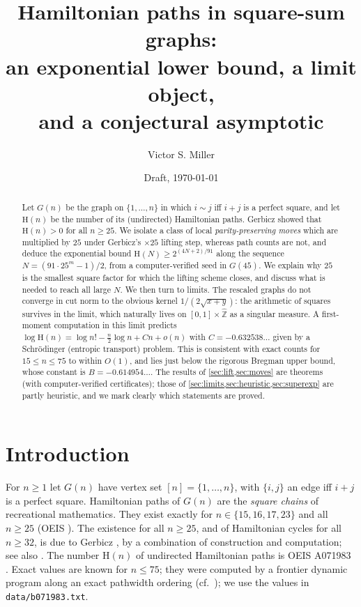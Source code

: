 \documentclass[11pt]{amsart}
\title[Hamiltonian paths in square-sum graphs]{Hamiltonian paths in square-sum graphs:\\
an exponential lower bound, a limit object,\\ and a conjectural asymptotic}
\author{Victor S. Miller}
\date{Draft, \today}
\theoremstyle{definition}
\newcommand{\Ham}{\mathrm{H}}
\newcommand{\Zhat}{\widehat{\mathbb{Z}}}
\begin{document}
\begin{abstract}
Let $G(n)$ be the graph on $\{1,\dots,n\}$ in which $i\sim j$ iff $i+j$ is a perfect
square, and let $\Ham(n)$ be the number of its (undirected) Hamiltonian paths.
Gerbicz showed that $\Ham(n)>0$ for all $n\ge 25$. We isolate a class of local
\emph{parity-preserving moves} which are multiplied by $25$ under Gerbicz's
$\times 25$ lifting step, whereas path counts are not, and deduce the exponential bound
$\Ham(N)\ge 2^{(4N+2)/91}$ along the sequence $N=(91\cdot 25^m-1)/2$,
from a computer-verified seed in $G(45)$. We explain why $25$ is the smallest
square factor for which the lifting scheme closes, and discuss what is needed to
reach all large $N$. We then turn to limits. The rescaled graphs do not converge in cut
norm to the obvious kernel $1/(2\sqrt{x+y})$: the arithmetic of squares
survives in the limit, which naturally lives on $[0,1]\times\Zhat$ as a singular
measure. A first-moment computation in this limit predicts
$\log \Ham(n) = \log n! - \tfrac n2\log n + Cn + o(n)$ with
$C=-0.632538\ldots$ given by a Schr\"odinger (entropic transport) problem. This is
consistent with exact counts for $15\le n\le 75$ to within $O(1)$, and lies
just below the rigorous Bregman upper bound, whose constant is $B=-0.614954\ldots$.
The results of \cref{sec:lift,sec:moves} are theorems
(with computer-verified certificates); those of \cref{sec:limits,sec:heuristic,sec:superexp}
are partly heuristic, and we mark clearly which statements are proved.
\end{abstract}

\maketitle

\section{Introduction}

For $n\ge1$ let $G(n)$ have vertex set $[n]=\{1,\dots,n\}$, with $\{i,j\}$ an edge iff
$i+j$ is a perfect square. Hamiltonian paths of $G(n)$ are the \emph{square chains}
of recreational mathematics. They exist exactly for $n\in\{15,16,17,23\}$ and all $n\ge25$
(OEIS \cite{OEIS-A090461}). The existence for all $n\ge 25$, and of Hamiltonian cycles
for all $n\ge32$, is due to Gerbicz \cite{Gerbicz}, by a combination of
construction and computation; see also \cite[Appendix]{BerlekampGuy}.
The number $\Ham(n)$ of undirected Hamiltonian paths is OEIS A071983
\cite{OEIS-A071983}. Exact values are known for $n\le 75$; they were computed by a frontier dynamic program along an exact pathwidth ordering
(cf.\ \cite{Pettersson,Coudert}); we use the values in \texttt{data/b071983.txt}.
\end{document}
